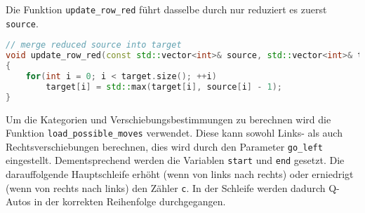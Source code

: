 \documentclass[a4paper,10pt,ngerman]{scrartcl}
\begin{document}
Die Funktion \lstinline{update_row_red} führt dasselbe durch nur reduziert es zuerst \lstinline{source}.
\begin{lstlisting}[language=C++]
// merge reduced source into target
void update_row_red(const std::vector<int>& source, std::vector<int>& target)
{
    for(int i = 0; i < target.size(); ++i)
        target[i] = std::max(target[i], source[i] - 1);
}
\end{lstlisting}

Um die Kategorien und Verschiebungsbestimmungen zu berechnen wird die Funktion \lstinline{load_possible_moves} verwendet.
Diese kann sowohl Links- als auch Rechtsverschiebungen berechnen, dies wird durch den Parameter \lstinline{go_left} eingestellt.
Dementsprechend werden die Variablen \lstinline{start} und \lstinline{end} gesetzt.
Die darauffolgende Hauptschleife erhöht (wenn von links nach rechts) oder erniedrigt (wenn von rechts nach links) den Zähler \lstinline{c}.
In der Schleife werden dadurch Q-Autos in der korrekten Reihenfolge durchgegangen.
\end{document}
